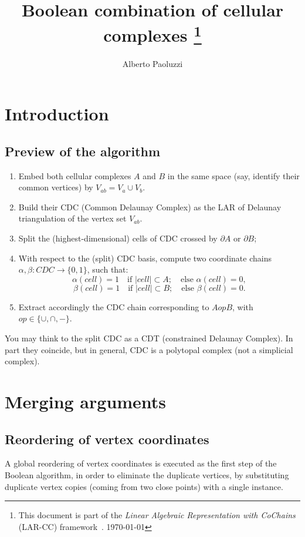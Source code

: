 \documentclass[11pt,oneside]{article}	%
\title{Boolean combination of cellular complexes
\footnote{This document is part of the \emph{Linear Algebraic Representation with CoChains} (LAR-CC) framework~\cite{cclar-proj:2013:00}. \today}
}
\author{Alberto Paoluzzi}
\begin{document}
\maketitle
\tableofcontents
\nonstopmode

\section{Introduction}

\subsection{Preview of the algorithm}


\begin{enumerate}
\item 
Embed both cellular complexes $A$ and $B$ in the same space (say, identify their common vertices) by $V_{ab} = V_a \cup V_b$.
\item 
Build their CDC  (Common Delaunay Complex) as the LAR of Delaunay triangulation of the vertex set $V_{ab}$.
\item 
Split the (highest-dimensional) cells of CDC crossed by $\partial A$ or $\partial B$;
\item 
With respect to the (split) CDC basis, compute two coordinate chains $\alpha,\beta: CDC \to \{0,1\}$, such that: 
\[
	\alpha(cell) = 1  \quad\mbox{if\ } |cell| \subset A;  \quad\mbox{else\ } \alpha(cell) = 0, 
\]
\[
	\beta(cell) = 1  \quad\mbox{if\ } |cell| \subset B;  \quad\mbox{else\ } \beta(cell) = 0.
\]
\item 
Extract accordingly the CDC chain corresponding to $A op B$, with $op\in \{\cup, \cap, -\}$.
\end{enumerate}

You may think to the split CDC as a CDT (constrained Delaunay Complex).  In part they coincide, but in general, CDC is a polytopal complex (not a simplicial complex).




\section{Merging arguments}

\subsection{Reordering of vertex coordinates}
A global reordering of vertex coordinates is executed as the first step of the Boolean algorithm, in order to eliminate the duplicate vertices, by substituting duplicate vertex copies (coming from two close points) with a single instance. 
\end{document}
